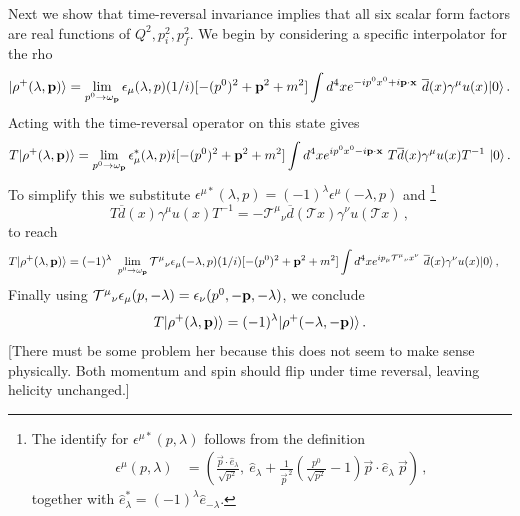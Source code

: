 {\mh Next we show that time-reversal invariance implies that all six scalar form factors are real functions of $Q^2,p_i^2,p_f^2$. We begin by
considering a specific interpolator for the rho
\begin{equation}
\vert \rho^+( \lambda, \textbf p ) \rangle =  \lim_{p^0 \to \omega_\textbf p}  \epsilon_{\mu}(\lambda, p)(1/i) [- (p^0)^2 + \textbf p^2 + m^2] \int d^4 x e^{- i p^0  x^0 + i \textbf p \cdot \textbf x} \ \overline d(x) \gamma^\mu u(x) \vert 0 \rangle \,.
\end{equation}
Acting with the time-reversal operator on this state gives
\begin{equation}
T \vert \rho^+( \lambda, \textbf p) \rangle =  \lim_{p^0 \to \omega_\textbf p} \epsilon^*_{\mu}(\lambda, p) i [- (p^0)^2 + \textbf p^2 + m^2] \int d^4 x e^{ i p^0  x^0 - i \textbf p \cdot \textbf x} \ T \overline d(x) \gamma^\mu u(x)     T^{-1} \  \vert 0 \rangle \,.
\end{equation}
To simplify this we substitute $\epsilon^{\mu*}( \lambda, p) = (-1)^\lambda \epsilon^{\mu}( - \lambda , p)$ and%
%
\footnote{
The identify for $\epsilon^{\mu*}( p, \lambda) $ follows from the definition
\begin{align}
\epsilon^{\mu}(p,\lambda) & =
\left(\frac{\vec{p}\cdot\hat{e}_\lambda}{ \sqrt{p^2} }, \ \hat{e}_\lambda + \frac{1}{\vec p^{\,2}} \left( \frac{p^0}{\sqrt{p^2}} - 1  \right) {\vec{p}\cdot\hat{e}_\lambda} \ \vec{p}\right) \,,
\end{align} 
together with $\hat{e}_{\lambda}^* = (-1)^\lambda \hat{e}_{-\lambda}$.
}
%  
\begin{equation}
T \overline d(x) \gamma^\mu u(x)     T^{-1} = - {\mathcal T^\mu}_\nu \overline d(\mathcal T x) \gamma^\nu u(\mathcal T x)     \,,
\end{equation}
to reach
\begin{align}
T \vert \rho^+( \lambda, \textbf p) \rangle & =   (- 1)^{\lambda}  \  \lim_{p^0 \to \omega_\textbf p}   {\mathcal T^\mu}_\nu   \epsilon_{\mu}(- \lambda, p) (1/i) [- (p^0)^2 + \textbf p^2 + m^2] \int d^4 x e^{ i p_\mu {\mathcal T^\mu}_\nu  x^\nu} \   \overline d(x) \gamma^\nu u(x)      \vert 0 \rangle \,, 
\end{align}
Finally using $ {\mathcal T^\mu}_\nu \epsilon_{\mu}(p, - \lambda) = \epsilon_{\nu}(p^0, - \textbf p, - \lambda)$, we conclude
\begin{equation}
 T \vert \rho^+(\lambda, \textbf p) \rangle = (-1)^\lambda \vert \rho^+(- \lambda ,- \textbf p) \rangle \,.
\end{equation}
[There must be some problem her because this does not seem to make sense physically. Both momentum and spin should flip under time reversal, leaving helicity unchanged.]

}
